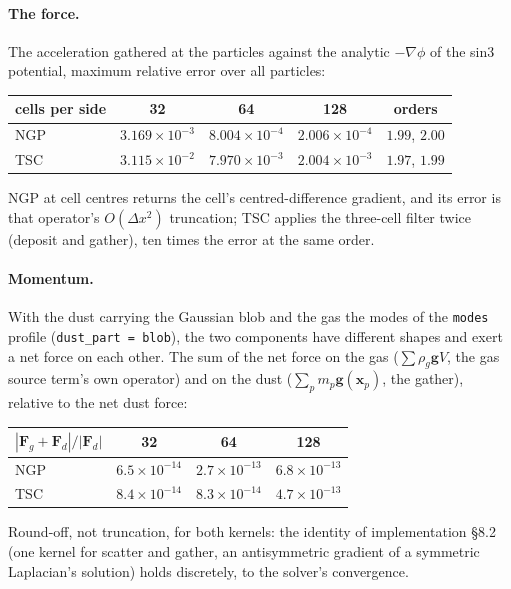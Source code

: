 \documentclass[11pt]{article}
\newcommand{\code}[1]{\texttt{#1}}
\begin{document}
\paragraph{The force.} The acceleration gathered at the particles against the analytic
$-\nabla\phi$ of the sin3 potential, maximum relative error over all particles:

\begin{center}
\small
\begin{tabular}{@{}lcccc@{}}
\toprule
cells per side & 32 & 64 & 128 & orders \\
\midrule
NGP & $3.169\times10^{-3}$ & $8.004\times10^{-4}$ & $2.006\times10^{-4}$ & $1.99$, $2.00$ \\
TSC & $3.115\times10^{-2}$ & $7.970\times10^{-3}$ & $2.004\times10^{-3}$ & $1.97$, $1.99$ \\
\bottomrule
\end{tabular}
\end{center}

NGP at cell centres returns the cell's centred-difference gradient, and its error is
that operator's $O(\Delta x^2)$ truncation; TSC applies the three-cell filter twice
(deposit and gather), ten times the error at the same order.

\paragraph{Momentum.} With the dust carrying the Gaussian blob and the gas the modes of
the \code{modes} profile (\code{dust\_part = blob}), the two components have different
shapes and exert a net force on each other. The sum of the net force on the gas
($\sum\rho_g\mathbf g V$, the gas source term's own operator) and on the dust
($\sum_p m_p\mathbf g(\mathbf x_p)$, the gather), relative to the net dust force:

\begin{center}
\small
\begin{tabular}{@{}lccc@{}}
\toprule
$|\mathbf F_g + \mathbf F_d| / |\mathbf F_d|$ & 32 & 64 & 128 \\
\midrule
NGP & $6.5\times10^{-14}$ & $2.7\times10^{-13}$ & $6.8\times10^{-13}$ \\
TSC & $8.4\times10^{-14}$ & $8.3\times10^{-14}$ & $4.7\times10^{-13}$ \\
\bottomrule
\end{tabular}
\end{center}

Round-off, not truncation, for both kernels: the identity of implementation \S8.2 (one
kernel for scatter and gather, an antisymmetric gradient of a symmetric Laplacian's
solution) holds discretely, to the solver's convergence.
\end{document}
